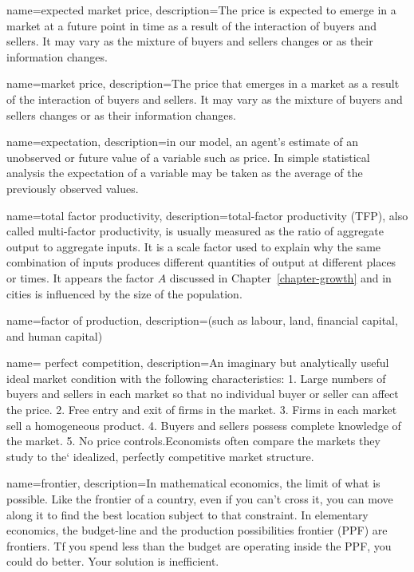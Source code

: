 {
name=expected market price,
description={The price is expected to emerge in a \gls{market} at a future point in time as a result of the interaction of buyers and sellers. It may vary as the mixture of buyers and sellers changes or as their information changes.}
}

{
name=market price,
description={The price that emerges in a \gls{market} as a result of the interaction of buyers and sellers. It may vary as the mixture of buyers and sellers changes or as their information changes.}
}

{
name=expectation,
description={in our model, an agent's estimate of an unobserved or future value of a variable such as price. In simple statistical analysis the expectation of a variable may be taken as the average of the previously observed values.  }
}


{
name=total factor productivity,
description={total-factor productivity (TFP), also called multi-factor productivity, is usually measured as the ratio of aggregate output  to aggregate inputs. It is a scale factor used to explain why the same combination of inputs produces different quantities of output at different places or times. It appears the factor  $A$ discussed in Chapter~\ref{chapter-growth} and in cities is influenced by the size of the population.  }
}

{
name=factor of production,
description={(such as labour, land, financial capital,  and human capital)}
}

{
name= perfect competition,
description={An imaginary but analytically useful ideal market condition with the following  characteristics: 1. Large numbers of buyers and sellers in each market so that no individual buyer or seller can affect the price. 2. Free entry and exit of firms in the market. 3. Firms in each market sell a homogeneous product. 4. Buyers and sellers possess complete knowledge of the market. 5. No price controls.\newline  Economists often compare the markets they study to the` idealized, perfectly competitive market structure.}
}

{
name=frontier,
description={In mathematical economics, the limit of what is possible. Like the frontier of a country, even if you can't cross it, you can move along it to find the best location  subject to that constraint. In elementary economics, the budget-line and the production possibilities frontier (PPF) are  frontiers. Tf you spend less than the budget are operating inside the PPF, you could do better. Your solution is inefficient. }
}

